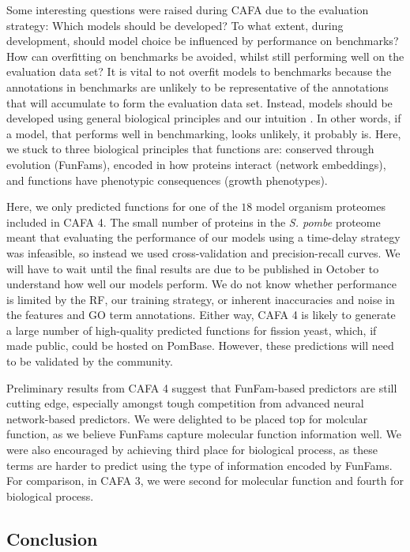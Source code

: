 Some interesting questions were raised during CAFA due to the evaluation strategy: Which models should be developed? To what extent, during development, should model choice be influenced by performance on benchmarks? How can overfitting on benchmarks be avoided, whilst still performing well on the evaluation data set? It is vital to not overfit models to benchmarks because the annotations in benchmarks are unlikely to be representative of the annotations that will accumulate to form the evaluation data set. Instead, models should be developed using general biological principles and our intuition \cite{Gigerenzer2014}. In other words, if a model, that performs well in benchmarking, looks unlikely, it probably is. Here, we stuck to three biological principles that functions are: conserved through evolution (FunFams), encoded in how proteins interact (network embeddings), and functions have phenotypic consequences (growth phenotypes).

Here, we only predicted functions for one of the $18$ model organism proteomes included in CAFA 4. The small number of proteins in the \emph{S. pombe} proteome meant that evaluating the performance of our models using a time-delay strategy was infeasible, so instead we used cross-validation and precision-recall curves. We will have to wait until the final results are due to be published in October to understand how well our models perform. We do not know whether performance is limited by the RF, our training strategy, or inherent inaccuracies and noise in the features and GO term annotations. Either way, CAFA 4 is likely to generate a large number of high-quality predicted functions for fission yeast, which, if made public, could be hosted on PomBase. However, these predictions will need to be validated by the community.

Preliminary results from CAFA 4 suggest that FunFam-based predictors are still cutting edge, especially amongst tough competition from advanced neural network-based predictors. We were delighted to be placed top for molcular function, as we believe FunFams capture molecular function information well. We were also encouraged by achieving third place for biological process, as these terms are harder to predict using the type of information encoded by FunFams. For comparison, in CAFA 3, we were second for molecular function and fourth for biological process.

\subsection{Conclusion}

